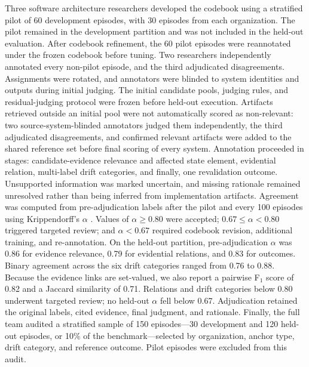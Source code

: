 \documentclass[10pt,conference]{IEEEtran}
\begin{document}
Three software architecture researchers developed the codebook using a stratified pilot of 60 development episodes, with 30 episodes from each organization. The pilot remained in the development partition and was not included in the held-out evaluation. After codebook refinement, the 60 pilot episodes were reannotated under the frozen codebook before tuning. Two researchers independently annotated every non-pilot episode, and the third adjudicated disagreements. Assignments were rotated, and annotators were blinded to system identities and outputs during initial judging. The initial candidate pools, judging rules, and residual-judging protocol were frozen before held-out execution. Artifacts retrieved outside an initial pool were not automatically scored as non-relevant: two source-system-blinded annotators judged them independently, the third adjudicated disagreements, and confirmed relevant artifacts were added to the shared reference set before final scoring of every system. Annotation proceeded in stages: candidate-evidence relevance and affected state element, evidential relation, multi-label drift categories, and finally, one revalidation outcome. Unsupported information was marked uncertain, and missing rationale remained unresolved rather than being inferred from implementation artifacts. Agreement was computed from pre-adjudication labels after the pilot and every 100 episodes using Krippendorff's $\alpha$ \cite{Krippendorff2018ContentAnalysis}. Values of $\alpha\geq0.80$ were accepted; $0.67\leq\alpha<0.80$ triggered targeted review; and $\alpha<0.67$ required codebook revision, additional training, and re-annotation. On the held-out partition, pre-adjudication $\alpha$ was 0.86 for evidence relevance, 0.79 for evidential relations, and 0.83 for outcomes. Binary agreement across the six drift categories ranged from 0.76 to 0.88. Because the evidence links are set-valued, we also report a pairwise F$_1$ score of 0.82 and a Jaccard similarity of 0.71. Relations and drift categories below 0.80 underwent targeted review; no held-out $\alpha$ fell below 0.67. Adjudication retained the original labels, cited evidence, final judgment, and rationale. Finally, the full team audited a stratified sample of 150 episodes---30 development and 120 held-out episodes, or 10\% of the benchmark---selected by organization, anchor type, drift category, and reference outcome. Pilot episodes were excluded from this audit. 
\end{document}
